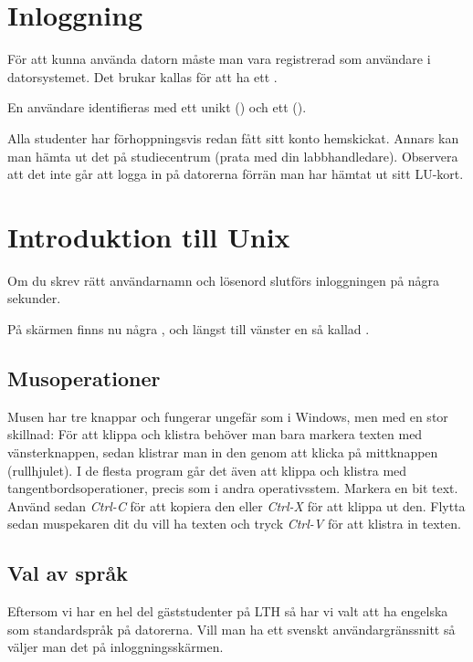 \documentclass[a4paper,twocolumn]{book}
\begin{document}
\section{Inloggning}

För att kunna använda datorn måste man vara registrerad som användare
i datorsystemet. Det brukar kallas för att ha ett .

En användare identifieras med ett unikt 
() och ett  ().

Alla studenter har förhoppningsvis redan fått sitt konto hemskickat. Annars
kan man hämta ut det på studiecentrum (prata med din labbhandledare). Observera att det inte går att logga in
på datorerna förrän man har hämtat ut sitt LU-kort.


\section{Introduktion till Unix}

Om du skrev rätt användarnamn och lösenord slutförs inloggningen på några
sekunder.

På skärmen finns nu några , och längst till vänster  en så kallad
.


\subsection{Musoperationer} %

Musen har tre knappar och fungerar ungefär som i Windows, men med en stor
skillnad: För att klippa och klistra behöver man bara markera texten med
vänsterknappen, sedan klistrar man in den genom att klicka på mittknappen
(rullhjulet). I de flesta program går det även att klippa och klistra med
tangentbordsoperationer, precis som i andra operativsstem.
Markera en bit text. Använd sedan \emph{Ctrl-C} för
att kopiera den eller \emph{Ctrl-X} för att klippa ut den. Flytta sedan
muspekaren dit du vill ha texten och tryck \emph{Ctrl-V} för att klistra in
texten.
\subsection{Val av språk}
Eftersom vi har en hel del gäststudenter på LTH så har vi valt att ha engelska
som standardspråk på datorerna. Vill man ha ett svenskt användargränssnitt så
väljer man det på inloggningsskärmen.
\end{document}
